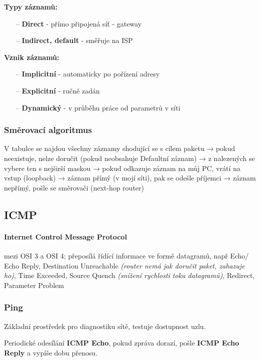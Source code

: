 \documentclass[10pt,a4paper]{article}
\begin{document}
\textbf{Typy záznamů:}
\begin{itemize}
    \item[--] \textbf{Direct} - přímo připojená síť - gateway
    \item[--] \textbf{Indirect, default} - směřuje na ISP
\end{itemize}


\textbf{Vznik záznamů:}
\begin{itemize}
    \item[--] \textbf{Implicitní} - automaticky po pořízení adresy
    \item[--] \textbf{Explicitní} - ručně zadán
    \item[--] \textbf{Dynamický} - v průběhu práce od parametrů v síti
\end{itemize} 

\subsubsection{Směrovací algoritmus} 

V tabulce se najdou všechny záznamy shodující se s cílem paketu → pokud neexistuje, nelze doručit (pokud neobsahuje Defaultní záznam) → z nalezených se vybere ten s nejširší maskou → pokud odkazuje záznam na můj PC, vrátí na vstup (loopback) → záznam přímý (v mojí síti), pak se odešle příjemci → záznam nepřímý, pošle se směrovači (next-hop router)


\subsection{ICMP}

\paragraph*{Internet Control Message Protocol} mezi OSI 3 a OSI 4; přeposílá řídící informace ve formě datagramů, např Echo/ Echo Reply, Destination Unreachable \textit{(router nemá jak doručit paket, zahazuje ho)}, Time Exceeded, Source Quench \textit{(snížení rychlosti toku datagramů)}, Redirect, Parameter Problem 

\subsubsection{Ping}

Základní prostředek pro diagnostiku sítě, testuje dostupnost uzlu.

Periodické odesílání \textbf{ICMP Echo}, pokud zpráva dorazí, pošle \textbf{ICMP Echo Reply} a vypíše dobu přenosu.
\end{document}
